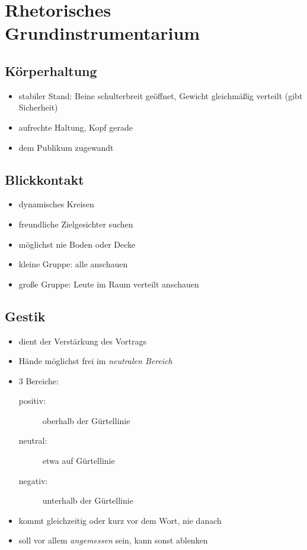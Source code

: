 \section{Rhetorisches Grundinstrumentarium}
\label{rhetorik-grundstrinumentarium}

\subsection{Körperhaltung}
\begin{itemize}
    \item stabiler Stand: Beine schulterbreit geöffnet, Gewicht gleichmäßig verteilt (gibt Sicherheit)
    \item aufrechte Haltung, Kopf gerade
    \item dem Publikum zugewandt
\end{itemize}

\subsection{Blickkontakt}
\begin{itemize}
    \item \glqq dynamisches Kreisen\grqq
    \item freundliche Zielgesichter suchen
    \item möglichst nie Boden oder Decke
    \item kleine Gruppe: alle anschauen
    \item große Gruppe: Leute im Raum verteilt anschauen
\end{itemize}

\subsection{Gestik}
\begin{itemize}
    \item dient der Verstärkung des Vortrags
    \item Hände möglichst frei im \emph{neutralen Bereich}
    \item 3 Bereiche:
    \begin{description}
        \item [positiv:] oberhalb der Gürtellinie
        \item [neutral:] etwa auf Gürtellinie
        \item [negativ:] unterhalb der Gürtellinie
    \end{description}
    \item kommt gleichzeitig oder kurz vor dem Wort, nie danach
    \item soll vor allem \emph{angemessen} sein, kann sonst ablenken
\end{itemize}

